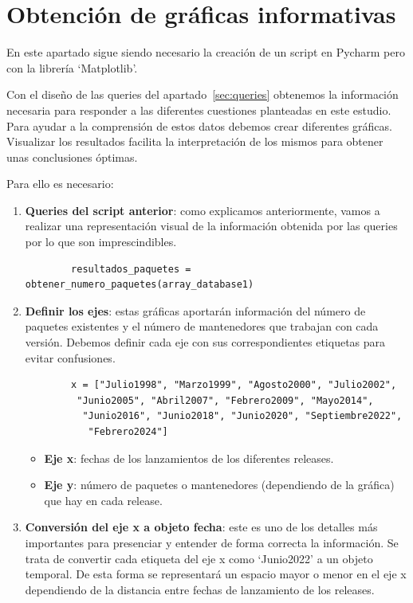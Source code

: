 \documentclass[a4paper, 12pt]{book}
\begin{document}
\section{Obtención de gráficas informativas}
\label{sec:graficas}

En este apartado sigue siendo necesario la creación de un script en Pycharm pero con la librería `Matplotlib'.

Con el diseño de las queries del apartado~\ref{sec:queries} obtenemos la información necesaria para responder a las diferentes cuestiones planteadas en este estudio.
Para ayudar a la comprensión de estos datos debemos crear diferentes gráficas.
Visualizar los resultados facilita la interpretación de los mismos para obtener unas conclusiones óptimas.

Para ello es necesario:
\begin{enumerate}
	\item \textbf{Queries del script anterior}: como explicamos anteriormente, vamos a realizar una representación visual de la información obtenida por las queries por lo que son imprescindibles.
	
	\begin{verbatim}
		resultados_paquetes = obtener_numero_paquetes(array_database1)
	\end{verbatim} 
	
	\item \textbf{Definir los ejes}: estas gráficas aportarán información del número de paquetes existentes y el número de mantenedores que trabajan con cada versión. Debemos definir cada eje con sus correspondientes etiquetas para evitar confusiones.
	
	\begin{verbatim}
		x = ["Julio1998", "Marzo1999", "Agosto2000", "Julio2002",
		 "Junio2005", "Abril2007", "Febrero2009", "Mayo2014",
		  "Junio2016", "Junio2018", "Junio2020", "Septiembre2022",
		   "Febrero2024"]
	\end{verbatim} 
	
	\begin{itemize}
		\item \textbf{Eje x}: fechas de los lanzamientos de los diferentes releases.
		
		\item \textbf{Eje y}: número de paquetes o mantenedores (dependiendo de la gráfica) que hay en cada release.
	\end{itemize}
	
	\item \textbf{Conversión del eje x a objeto fecha}: este es uno de los detalles más importantes para presenciar y entender de forma correcta la información. Se trata de convertir cada etiqueta del eje x como `Junio2022' a un objeto temporal. De esta forma se representará un espacio mayor o menor en el eje x dependiendo de la distancia entre fechas de lanzamiento de los releases.
	

\end{enumerate}
\end{document}
